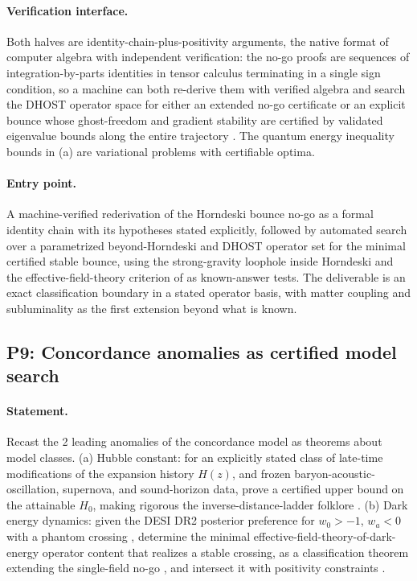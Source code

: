 \documentclass[11pt,letterpaper]{article}
\begin{document}
\paragraph{Verification interface.} Both halves are identity-chain-plus-positivity arguments, the native format of computer algebra with independent verification: the no-go proofs are sequences of integration-by-parts identities in tensor calculus terminating in a single sign condition, so a machine can both re-derive them with verified algebra and search the DHOST operator space for either an extended no-go certificate or an explicit bounce whose ghost-freedom and gradient stability are certified by validated eigenvalue bounds along the entire trajectory \cite{arb2017}. The quantum energy inequality bounds in (a) are variational problems with certifiable optima.

\paragraph{Entry point.} A machine-verified rederivation of the Horndeski bounce no-go as a formal identity chain with its hypotheses stated explicitly, followed by automated search over a parametrized beyond-Horndeski and DHOST operator set for the minimal certified stable bounce, using the strong-gravity loophole inside Horndeski and the effective-field-theory criterion of \cite{creminelli2016} as known-answer tests. The deliverable is an exact classification boundary in a stated operator basis, with matter coupling and subluminality as the first extension beyond what is known.

\subsection{P9: Concordance anomalies as certified model search}
\label{sec:p9}

\paragraph{Statement.} Recast the 2 leading anomalies of the concordance model as theorems about model classes. (a) Hubble constant: for an explicitly stated class of late-time modifications of the expansion history $H(z)$, and frozen baryon-acoustic-oscillation, supernova, and sound-horizon data, prove a certified upper bound on the attainable $H_0$, making rigorous the inverse-distance-ladder folklore \cite{knoxmillea2020}. (b) Dark energy dynamics: given the DESI DR2 posterior preference for $w_0>-1$, $w_a<0$ with a phantom crossing \cite{desi2025}, determine the minimal effective-field-theory-of-dark-energy operator content that realizes a stable crossing, as a classification theorem extending the single-field no-go \cite{vikman2005,quintom2010}, and intersect it with positivity constraints \cite{adams2006}.
\end{document}
